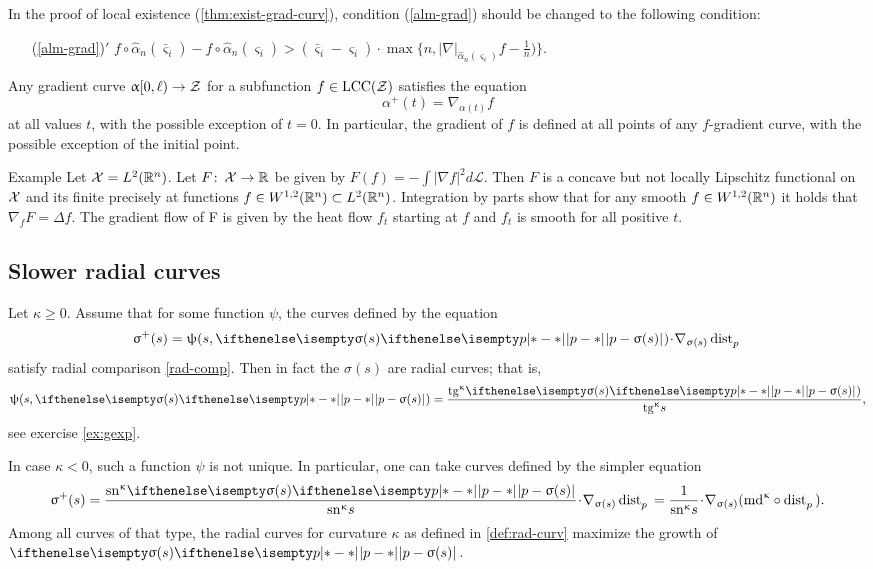 \medskip

In the proof of local existence (\ref{thm:exist-grad-curv}), condition (\ref{alm-grad})
should be changed to the following condition:
\begin{itemize}

\item[{(\ref{alm-grad})}$'$]
$f\circ\hat\alpha_n(\bar\varsigma_i)-f\circ\hat\alpha_n(\varsigma_i)
>
(\bar\varsigma_i-\varsigma_i)
\cdot
\max\{n,|\nabla|_{\hat\alpha_n(\varsigma_i)}f-\tfrac{1}{n})\}.$
\end{itemize}

Any gradient curve $\alpha[0,\ell)\to\spc{Z}$
for a subfunction
$f\in \LSCSC(\spc{Z})$
satisfies the equation
\[\alpha^+(t)=\nabla_{\alpha(t)} f\]
at all values $t$, with the possible exception of $t=0$.
In particular, the gradient of $f$ is defined at all points of any 
$f$-gradient curve, with the possible exception of the initial point.

\begin{thm}{Example}
Let $\mathcal{X}=L^2(\mathbb{R}^n)$. Let $F\co \spc{X}\to \R$ be given  by $F(f)=-\int|\nabla f|^2d\mathcal L$. Then $F$ is a concave but not locally Lipschitz functional on $\mathcal{X}$ and its finite precisely at functions $f\in W^{1,2}(\R^n)\subset L^2(\R^n)$. Integration by parts show that for any smooth $f\in W^{1,2}(\R^n)$ it holds that $\nabla_fF=\Delta f$.
The gradient flow of F is given by the heat flow $f_t$ starting at $f$ and $f_t$ is smooth for all positive $t$.
\end{thm}

\subsection*{Slower radial curves}
Let $\kappa\ge 0$. 
Assume that for some function $\psi$, the curves defined by the equation 
\[\sigma^+(s)=\psi(s,\dist{p}{\sigma(s)}{})\cdot\nabla_{\sigma(s)}\distfun{p}{}{}\]
satisfy radial comparison \ref{rad-comp}.
Then in fact the $\sigma(s)$ are radial curves; 
that is, 
\[\psi(s,\dist{p}{\sigma(s)}{})= \frac{\tg\kappa\dist[{{}}]{p}{\sigma(s)}{})}{\tg\kappa s},\]
see exercise \ref{ex:gexp}.

In case $\kappa<0$, such a function $\psi$ is not unique.
In particular, one can take curves defined by the simpler equation
\[\sigma^+(s)
=
\frac{\sn\kappa \dist[{{}}]{p}{\sigma(s)}{}}{\sn\kappa s}\cdot\nabla_{\sigma(s)}\distfun{p}{}{}
=
\frac{1}{\sn\kappa s}\cdot\nabla_{\sigma(s)}(\md\kappa\circ\distfun{p}{}{}).\]
Among all curves of that type, the radial curves for curvature $\kappa$ 
as defined in \ref{def:rad-curv} maximize the growth of $\dist{p}{\sigma(s)}{}$.




